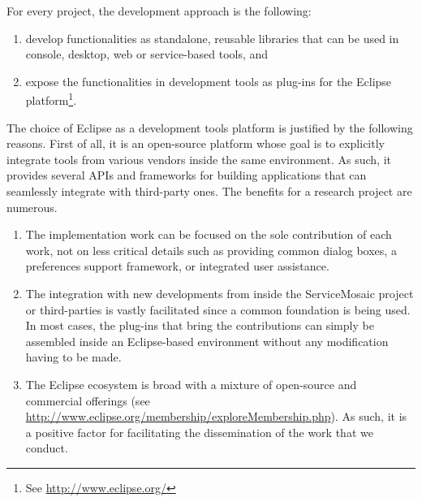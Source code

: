For every project, the development approach is the following:
\begin{enumerate}
  
  \item develop functionalities as standalone, reusable libraries that can be used in console, desktop, web or service-based tools, and
  
  \item expose the functionalities in development tools as plug-ins for the Eclipse platform\footnote{See \url{http://www.eclipse.org/}}.
  
\end{enumerate}

The choice of Eclipse as a development tools platform is justified by the following reasons. First of all, it is an open-source platform whose goal is to explicitly integrate tools from various vendors inside the same environment. As such, it provides several APIs and frameworks for building applications that can seamlessly integrate with third-party ones. The benefits for a research project are numerous.
\begin{enumerate}
  
  \item The implementation work can be focused on the sole contribution of each work, not on less critical details such as providing common dialog boxes, a preferences support framework, or integrated user assistance.
  
  \item The integration with new developments from inside the ServiceMosaic project or third-parties is vastly facilitated since a common foundation is being used. In most cases, the plug-ins that bring the contributions can simply be assembled inside an Eclipse-based environment without any modification having to be made.
  
  \item The Eclipse ecosystem is broad with a mixture of open-source and commercial offerings (see \url{http://www.eclipse.org/membership/exploreMembership.php}). As such, it is a positive factor for facilitating the dissemination of the work that we conduct.
  
\end{enumerate}

